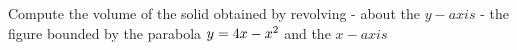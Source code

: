 
%
%
%
%
% 
% 


\question[4] Compute the volume of the solid obtained by revolving - about the $y-axis$ -
the figure bounded by the parabola $y=4 x-x^2$ and the $x-axis$

\watchout
{}

